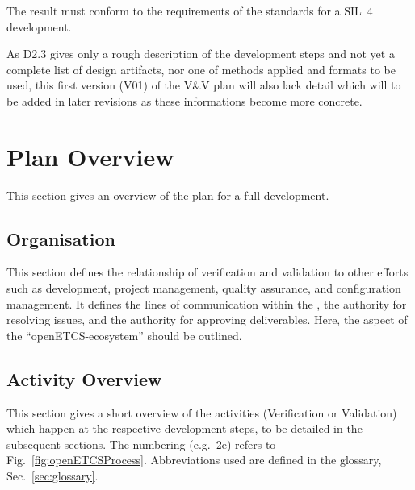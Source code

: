 \documentclass{template/openetcs_report}
\begin{document}
The result must conform to the requirements of the standards for a
SIL~4 development.

  As D2.3 gives only a rough description of the development steps and
  not yet a complete list of design artifacts, nor one of methods
  applied and formats to be used, this first version (V01) of the V\&V plan
  will also lack detail which will to be added in later revisions as
  these informations become more concrete.

\section{\VV Plan Overview}
\label{sec:plan-overview}

This section gives an overview of the \vv plan for a full development. 

\subsection{\VV Organisation}
\label{sec:vv-organisation}

This section defines the relationship of verification and validation
to other efforts such as development, project management, quality
assurance, and configuration management. It defines the lines of
communication within the \vv, the authority for resolving issues, and
the authority for approving \vv deliverables. Here, the \vv aspect of
the ``openETCS-ecosystem'' should be outlined.



\subsection{\VV Activity Overview}
\label{sec:vv-activ-overv}

This section gives a short overview of the activities (Verification or Validation) which
happen at the respective development steps, to be detailed in the
subsequent sections. The numbering (e.g.\ 2e) refers to
Fig.~\ref{fig:openETCSProcess}. Abbreviations used are defined in the
glossary, Sec.~\ref{sec:glossary}.
\end{document}
